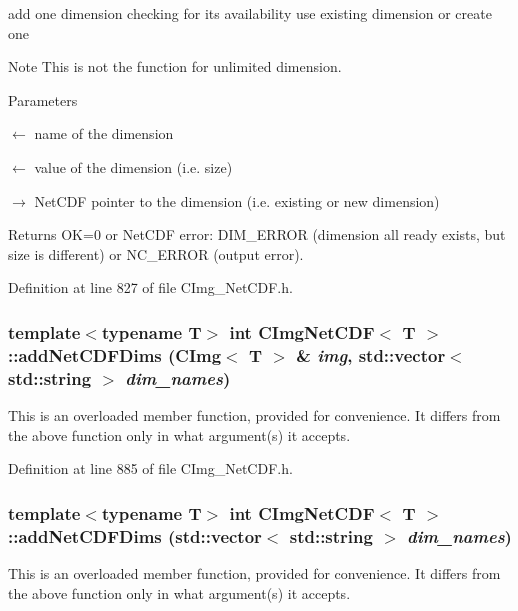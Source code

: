 add one dimension checking for its availability use existing dimension or create one \begin{DoxyNote}{Note}
This is not the function for {\ttfamily unlimited} dimension. 
\end{DoxyNote}

\begin{DoxyParams}{Parameters}
\item[\mbox{$\leftarrow$} {\em }]name of the dimension \item[\mbox{$\leftarrow$} {\em }]value of the dimension (i.e. size) \item[\mbox{$\rightarrow$} {\em }]NetCDF pointer to the dimension (i.e. existing or new dimension) \end{DoxyParams}
\begin{DoxyReturn}{Returns}
OK=0 or NetCDF error: DIM\_\-ERROR (dimension all ready exists, but size is different) or NC\_\-ERROR (output error). 
\end{DoxyReturn}


Definition at line 827 of file CImg\_\-NetCDF.h.\hypertarget{classCImgNetCDF_aa2f07806e9316d68926abebdb9f9949b}{
\subsubsection[{addNetCDFDims}]{\setlength{\rightskip}{0pt plus 5cm}template$<$typename T$>$ int {\bf CImgNetCDF}$<$ T $>$::addNetCDFDims (CImg$<$ T $>$ \& {\em img}, \/  std::vector$<$ std::string $>$ {\em dim\_\-names})}}
\label{classCImgNetCDF_aa2f07806e9316d68926abebdb9f9949b}
This is an overloaded member function, provided for convenience. It differs from the above function only in what argument(s) it accepts. 

Definition at line 885 of file CImg\_\-NetCDF.h.\hypertarget{classCImgNetCDF_a1d3023907a79dd51f64eaabe6d42b040}{
\subsubsection[{addNetCDFDims}]{\setlength{\rightskip}{0pt plus 5cm}template$<$typename T$>$ int {\bf CImgNetCDF}$<$ T $>$::addNetCDFDims (std::vector$<$ std::string $>$ {\em dim\_\-names})}}
\label{classCImgNetCDF_a1d3023907a79dd51f64eaabe6d42b040}
This is an overloaded member function, provided for convenience. It differs from the above function only in what argument(s) it accepts. 

